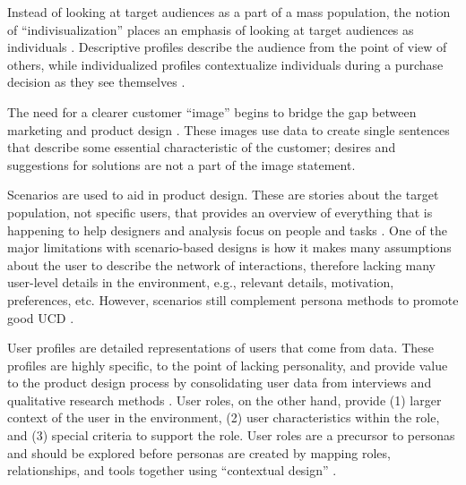 \documentclass[010-intro.tex]{subfiles}
\begin{document}
    Instead of looking at target audiences as a part of a mass population,
    the notion of ``indivisualization'' places an emphasis of looking at target audiences as individuals
    \cite{upshawBuildingBrandIdentity1995, pruittPersonaLifecycleKeeping2006}.
    Descriptive profiles describe the audience from the point of view of others,
    while individualized profiles contextualize individuals during a purchase decision as they see themselves
    \cite{upshawBuildingBrandIdentity1995, pruittPersonaLifecycleKeeping2006}.

    The need for a clearer customer ``image'' begins to bridge the gap between marketing and product design
    \cite{melloCustomercentricProductDefinition2003, pruittPersonaLifecycleKeeping2006}.
    These images use data to create single sentences that describe some essential characteristic of the customer;
    desires and suggestions for solutions are not a part of the image statement.

    Scenarios are used to aid in product design.
    These are stories about the target population,
    not specific users,
    that provides an overview of everything that is happening to help designers and analysis focus on people and tasks
    \cite{carrollScenarioBasedDesignEnvisioning1995, pruittPersonaLifecycleKeeping2006}.
    One of the major limitations with scenario-based designs is how it makes many assumptions
    about the user to describe the network of interactions,
    therefore lacking many user-level details in the environment,
    e.g., relevant details, motivation, preferences, etc.
    However, scenarios still complement persona methods to promote good UCD
    \cite{mikkelsonIncorporatingUserArchetypes2000, pruittPersonaLifecycleKeeping2006}.

    User profiles are detailed representations of users that come from data.
    These profiles are highly specific, to the point of lacking personality,
    and provide value to the product design process by consolidating
    user data from interviews and qualitative research methods
    \cite{redishUserTaskAnalysis1998}.
    User roles, on the other hand,
    provide
    (1) larger context of the user in the environment,
    (2) user characteristics within the role, and
    (3) special criteria to support the role.
    User roles are a precursor to personas and should be explored before personas are created
    by mapping roles, relationships, and tools together using ``contextual design''
    \cite{constantinePersonas2001, holtzblattContextualDesignDefining1997, holtzblattPersonasContextualDesign2002, tahirWhoOtherSide1997}.
\end{document}
